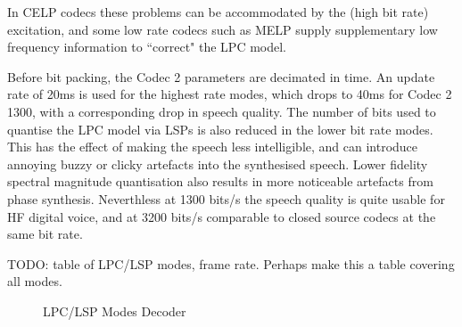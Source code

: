 \documentclass{article}
\begin{document}
In CELP codecs these problems can be accommodated by the (high bit rate) excitation, and some low rate codecs such as MELP supply supplementary low frequency information to ``correct" the LPC model.

Before bit packing, the Codec 2 parameters are decimated in time.  An update rate of 20ms is used for the highest rate modes, which drops to 40ms for Codec 2 1300, with a corresponding drop in speech quality.  The number of bits used to quantise the LPC model via LSPs is also reduced in the lower bit rate modes.  This has the effect of making the speech less intelligible, and can introduce annoying buzzy or clicky artefacts into the synthesised speech.  Lower fidelity spectral magnitude quantisation also results in more noticeable artefacts from phase synthesis.  Neverthless at 1300 bits/s the speech quality is quite usable for HF digital voice, and at 3200 bits/s comparable to closed source codecs at the same bit rate.

TODO: table of LPC/LSP modes, frame rate.  Perhaps make this a table covering all modes.

\begin{figure}[h]
\caption{LPC/LSP Modes Decoder}
\label{fig:decoder_lpc_lsp}
\begin{center}
\end{center}
\end{figure}
\end{document}
